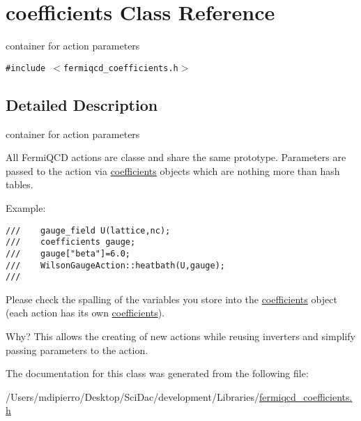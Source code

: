 \hypertarget{classcoefficients}{
\section{coefficients Class Reference}
\label{classcoefficients}
}
container for action parameters  


{\tt \#include $<$fermiqcd\_\-coefficients.h$>$}



\subsection{Detailed Description}
container for action parameters 

All FermiQCD actions are classe and share the same prototype. Parameters are passed to the action via \hyperlink{classcoefficients}{coefficients} objects which are nothing more than hash tables.

Example: 

\footnotesize\begin{verbatim}
///    gauge_field U(lattice,nc);
///    coefficients gauge;
///    gauge["beta"]=6.0;
///    WilsonGaugeAction::heatbath(U,gauge);
/// \end{verbatim}
\normalsize
 Please check the spalling of the variables you store into the \hyperlink{classcoefficients}{coefficients} object (each action has its own \hyperlink{classcoefficients}{coefficients}).

Why? This allows the creating of new actions while reusing inverters and simplify passing parameters to the action. 

The documentation for this class was generated from the following file:\begin{CompactItemize}
\item 
/Users/mdipierro/Desktop/SciDac/development/Libraries/\hyperlink{fermiqcd__coefficients_8h}{fermiqcd\_\-coefficients.h}\end{CompactItemize}
